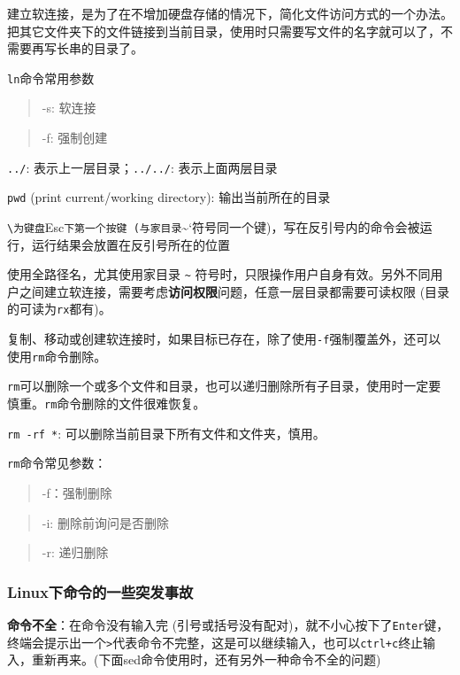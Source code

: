 \documentclass[]{article}
\numberwithin{figure}{section}
\numberwithin{table}{section}
\begin{document}
建立软连接，是为了在不增加硬盘存储的情况下，简化文件访问方式的一个办法。把其它文件夹下的文件链接到当前目录，使用时只需要写文件的名字就可以了，不需要再写长串的目录了。

\texttt{ln}命令常用参数

\begin{quote}
-s: 软连接
\end{quote}

\begin{quote}
-f: 强制创建
\end{quote}

\texttt{../}: 表示上一层目录；\texttt{../../}: 表示上面两层目录

\texttt{pwd} (print current/working directory): 输出当前所在的目录

\texttt{\textbackslash{}\textasciigrave{}\textasciigrave{}为键盘}Esc\texttt{下第一个按键\ (与家目录}\textasciitilde`符号同一个键)，写在反引号内的命令会被运行，运行结果会放置在反引号所在的位置

使用全路径名，尤其使用家目录 \texttt{\textasciitilde{}} 符号时，只限操作用户自身有效。另外不同用户之间建立软连接，需要考虑\textbf{访问权限}问题，任意一层目录都需要可读权限 (目录的可读为\texttt{rx}都有)。

复制、移动或创建软连接时，如果目标已存在，除了使用\texttt{-f}强制覆盖外，还可以使用\texttt{rm}命令删除。

\texttt{rm}可以删除一个或多个文件和目录，也可以递归删除所有子目录，使用时一定要慎重。\texttt{rm}命令删除的文件很难恢复。

\texttt{rm\ -rf\ *}: 可以删除当前目录下所有文件和文件夹，慎用。

\texttt{rm}命令常见参数：

\begin{quote}
-f：强制删除
\end{quote}

\begin{quote}
-i: 删除前询问是否删除
\end{quote}

\begin{quote}
-r: 递归删除
\end{quote}

\hypertarget{linux_abnormal}{%
\subsubsection{Linux下命令的一些突发事故}\label{linux_abnormal}}

\textbf{命令不全}：在命令没有输入完 (引号或括号没有配对)，就不小心按下了\texttt{Enter}键，终端会提示出一个\texttt{\textgreater{}}代表命令不完整，这是可以继续输入，也可以\texttt{ctrl+c}终止输入，重新再来。(下面sed命令使用时，还有另外一种命令不全的问题)
\end{document}

